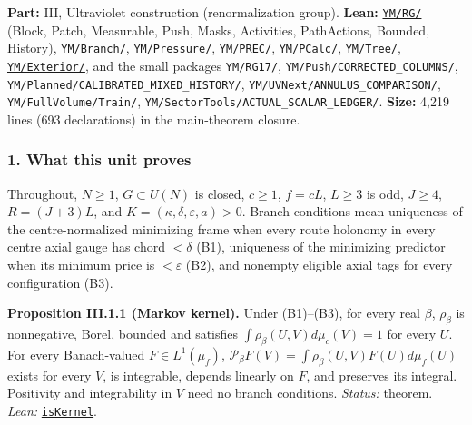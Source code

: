 \documentclass[
  letterpaper,
  11pt]{article}
\newcounter{none} %
\begin{document}
\textbf{Part:} III, Ultraviolet construction (renormalization group).
\textbf{Lean:}
\href{https://github.com/yang-mills-group/OpenAI-YM-20261028/tree/3456e5e75cf8d4cd558955a5c7638fba2d68f464/YM/RG}{\texttt{YM/RG/}}
(Block, Patch, Measurable, Push, Masks, Activities, PathActions,
Bounded, History),
\href{https://github.com/yang-mills-group/OpenAI-YM-20261028/tree/3456e5e75cf8d4cd558955a5c7638fba2d68f464/YM/Branch}{\texttt{YM/Branch/}},
\href{https://github.com/yang-mills-group/OpenAI-YM-20261028/tree/3456e5e75cf8d4cd558955a5c7638fba2d68f464/YM/Pressure}{\texttt{YM/Pressure/}},
\href{https://github.com/yang-mills-group/OpenAI-YM-20261028/tree/3456e5e75cf8d4cd558955a5c7638fba2d68f464/YM/PREC}{\texttt{YM/PREC/}},
\href{https://github.com/yang-mills-group/OpenAI-YM-20261028/tree/3456e5e75cf8d4cd558955a5c7638fba2d68f464/YM/PCalc}{\texttt{YM/PCalc/}},
\href{https://github.com/yang-mills-group/OpenAI-YM-20261028/tree/3456e5e75cf8d4cd558955a5c7638fba2d68f464/YM/Tree}{\texttt{YM/Tree/}},
\href{https://github.com/yang-mills-group/OpenAI-YM-20261028/tree/3456e5e75cf8d4cd558955a5c7638fba2d68f464/YM/Exterior}{\texttt{YM/Exterior/}},
and the small packages \texttt{YM/RG17/},
\texttt{YM/Push/CORRECTED\_COLUMNS/},
\texttt{YM/Planned/CALIBRATED\_MIXED\_HISTORY/},
\texttt{YM/UVNext/ANNULUS\_COMPARISON/}, \texttt{YM/FullVolume/Train/},
\texttt{YM/SectorTools/ACTUAL\_SCALAR\_LEDGER/}. \textbf{Size:} 4,219
lines (693 declarations) in the main-theorem closure.

\subsubsection{1. What this unit proves}\label{what-this-unit-proves-3}

Throughout, \(N\ge1\), \(G\subset U(N)\) is closed, \(c\ge1\), \(f=cL\),
\(L\ge3\) is odd, \(J\ge4\), \(R=(J+3)L\), and
\(K=(\kappa,\delta,\varepsilon,a)>0\). Branch conditions mean uniqueness
of the centre-normalized minimizing frame when every route holonomy in
every centre axial gauge has chord \(<\delta\) (B1), uniqueness of the
minimizing predictor when its minimum price is \(<\varepsilon\) (B2),
and nonempty eligible axial tags for every configuration (B3).

\textbf{Proposition III.1.1 (Markov kernel).} Under (B1)--(B3), for
every real \(\beta\), \(\rho_\beta\) is nonnegative, Borel, bounded and
satisfies \(\int\rho_\beta(U,V)d\mu_c(V)=1\) for every \(U\). For every
Banach-valued \(F\in L^1(\mu_f)\),
\(\mathcal P_\beta F(V)=\int\rho_\beta(U,V)F(U)d\mu_f(U)\) exists for
every \(V\), is integrable, depends linearly on \(F\), and preserves its
integral. Positivity and integrability in \(V\) need no branch
conditions. \emph{Status:} theorem. \emph{Lean:}
\href{https://github.com/yang-mills-group/OpenAI-YM-20261028/blob/3456e5e75cf8d4cd558955a5c7638fba2d68f464/YM/RG/Block.lean\#L203-L208}{\texttt{isKernel}}.
\end{document}
